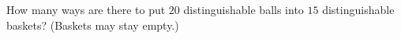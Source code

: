 How many ways are there to put $20$ distinguishable balls into $15$ distinguishable baskets? (Baskets may stay empty.)

